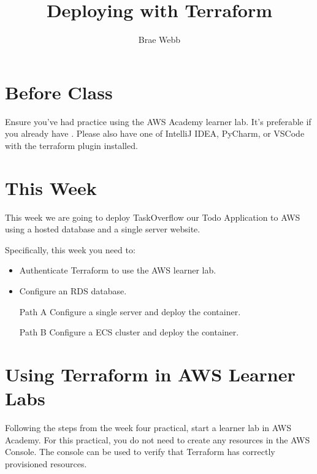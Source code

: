 \documentclass{csse4400}
\title{Deploying with Terraform}
\author{Brae Webb}
\date{\week{3}}
\begin{document}
\maketitle

\section{Before Class}
Ensure you've had practice using the AWS Academy learner lab.
It's preferable if you already have .
Please also have one of IntelliJ IDEA, PyCharm, or VSCode with the terraform plugin installed.

\section{This Week}
This week we are going to deploy TaskOverflow our Todo Application to AWS using a hosted database and a single server website.

Specifically, this week you need to:
\begin{itemize}
    \item Authenticate Terraform to use the AWS learner lab.
    \item Configure an RDS database.
    \item [Path A] Configure a single server and deploy the container.
    \item [Path B] Configure a ECS cluster and deploy the container.
\end{itemize}

\section{Using Terraform in AWS Learner Labs}
Following the steps from the week four practical, start a learner lab in AWS Academy.
For this practical, you do not need to create any resources in the AWS Console.
The console can be used to verify that Terraform has correctly provisioned resources.
\end{document}
